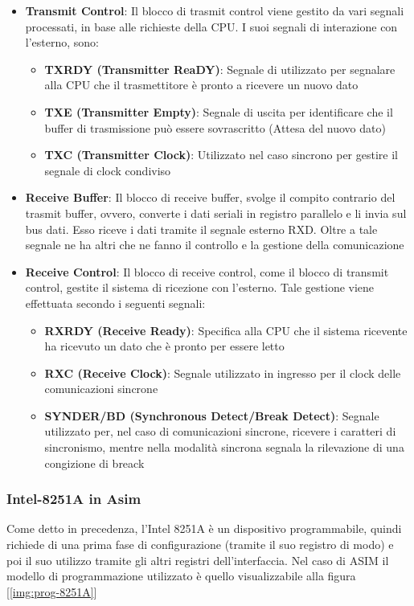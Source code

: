 \begin{itemize}
    \item \textbf{Transmit Control}: Il blocco di trasmit control viene gestito da vari segnali processati, in base alle richieste della CPU. I suoi segnali di interazione con l'esterno, sono:
    \begin{itemize}
        \item \textbf{TXRDY (Transmitter ReaDY)}: Segnale di utilizzato per segnalare alla CPU che il trasmettitore è pronto a ricevere un nuovo dato
        \item \textbf{TXE (Transmitter Empty)}: Segnale di uscita per identificare che il buffer di trasmissione può essere sovrascritto (Attesa del nuovo dato)
        \item \textbf{TXC (Transmitter Clock)}: Utilizzato nel caso sincrono per gestire il segnale di clock condiviso
    \end{itemize}
    
    \item \textbf{Receive Buffer}: Il blocco di receive buffer, svolge il compito contrario del trasmit buffer, ovvero, converte i dati seriali in registro parallelo e li invia sul bus dati. Esso riceve i dati tramite il segnale esterno RXD. Oltre a tale segnale ne ha altri che ne fanno il controllo e la gestione della comunicazione
    
    \item \textbf{Receive Control}: Il blocco di receive control, come il blocco di transmit control, gestite il sistema di ricezione con l'esterno. Tale gestione viene effettuata secondo i seguenti segnali:
    \begin{itemize}
        \item \textbf{RXRDY (Receive Ready)}: Specifica alla CPU che il sistema ricevente ha ricevuto un dato che è pronto per essere letto
        \item \textbf{RXC (Receive Clock)}: Segnale utilizzato in ingresso per il clock delle comunicazioni sincrone
        \item \textbf{SYNDER/BD (Synchronous Detect/Break Detect)}: Segnale utilizzato per, nel caso di comunicazioni sincrone, ricevere i caratteri di sincronismo, mentre nella modalità sincrona segnala la rilevazione di una congizione di breack
    \end{itemize}
\end{itemize}

\subsubsection{Intel-8251A in Asim}
Come detto in precedenza, l'Intel 8251A è un dispositivo programmabile, quindi richiede di una prima fase di configurazione (tramite il suo registro di modo) e poi il suo utilizzo tramite gli altri registri dell'interfaccia. Nel caso di ASIM il modello di programmazione utilizzato è quello visualizzabile alla figura [\ref{img:prog-8251A}]

